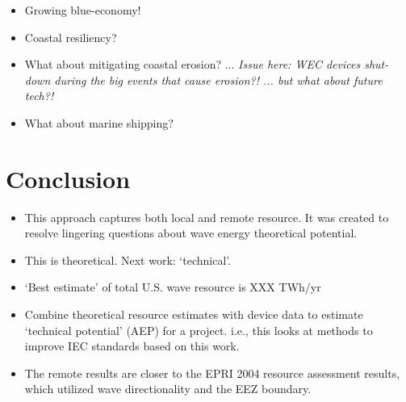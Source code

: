 \begin{itemize}
\item Growing blue-economy!
\item Coastal resiliency?
\item What about mitigating coastal erosion? ... {\it Issue here: WEC devices shut-down during the big events that cause erosion?! ... but what about future tech?!}
\item What about marine shipping?
\end{itemize}


\section{Conclusion} \label{sec:conclusion}

\begin{itemize}
\item This approach captures both local and remote resource. It was created to resolve lingering questions about wave energy theoretical potential.
\item This is theoretical. Next work: ‘technical’.
\item ‘Best estimate’ of total U.S. wave resource is XXX TWh/yr
\item Combine theoretical resource estimates with device data to estimate ‘technical potential’ (AEP) for a project. i.e., this looks at methods to improve IEC standards based on this work.
\item The remote results are closer to the EPRI 2004 resource assessment results, which utilized wave directionality and the EEZ boundary.
\end{itemize}


